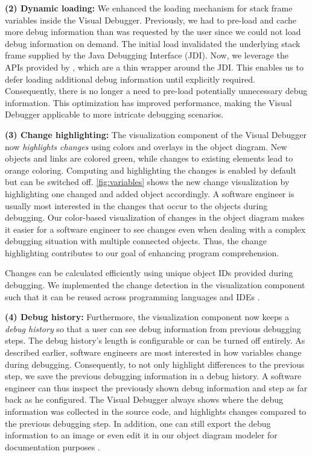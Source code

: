\documentclass[sigconf]{acmart}
\begin{document}
\textbf{(2) Dynamic loading:} We enhanced the loading mechanism for stack frame variables inside the Visual Debugger.
Previously, we had to pre-load and cache more debug information than was requested by the user since we could not load debug information on demand.
The initial load invalidated the underlying stack frame supplied by the Java Debugging Interface (JDI).
Now, we leverage the APIs provided by \intellij{}, which are a thin wrapper around the JDI.
This enables us to defer loading additional debug information until explicitly required.
Consequently, there is no longer a need to pre-load potentially unnecessary debug information.
This optimization has improved performance, making the Visual Debugger applicable to more intricate debugging scenarios.

\textbf{(3) Change highlighting:} The visualization component of the Visual Debugger now \textit{highlights changes} using colors and overlays in the object diagram.
New objects and links are colored green, while changes to existing elements lead to orange coloring.
Computing and highlighting the changes is enabled by default but can be switched off.
\autoref{fig:variables} shows the new change visualization by highlighting one changed and added object accordingly.
A software engineer is usually most interested in the changes that occur to the objects during debugging.
Our color-based visualization of changes in the object diagram makes it easier for a software engineer to see changes even when dealing with a complex debugging situation with multiple connected objects.
Thus, the change highlighting contributes to our goal of enhancing program comprehension.

Changes can be calculated efficiently using unique object IDs provided during debugging.
We implemented the change detection in the visualization component such that it can be reused across programming languages and IDEs \cite{timkrauterICSE2024Artifacts2023}.

\textbf{(4) Debug history:} Furthermore, the visualization component now keeps a \textit{debug history} so that a user can see debug information from previous debugging steps.
The debug history's length is configurable or can be turned off entirely.
As described earlier, software engineers are most interested in how variables change during debugging.
Consequently, to not only highlight differences to the previous step, we save the previous debugging information in a debug history.
A software engineer can thus inspect the previously shown debug information and step as far back as he configured.
The Visual Debugger always shows where the debug information was collected in the source code, and highlights changes compared to the previous debugging step.
In addition, one can still export the debug information to an image or even edit it in our object diagram modeler \cite{timkrauterObjectdiagramjs2023} for documentation purposes \cite{krauterVisualDebuggerTool2022}.
\end{document}
